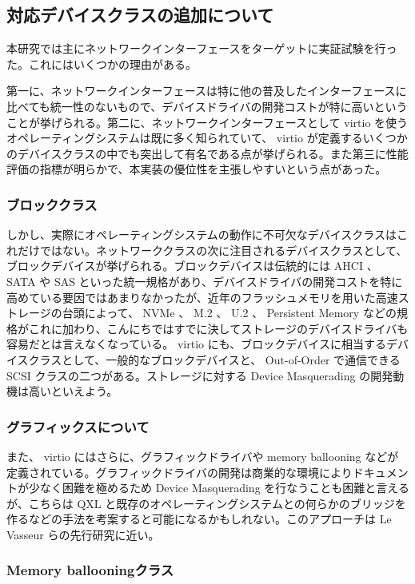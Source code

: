\documentclass[a4paper,11pt,report]{ltjsbook}
\begin{document}
\subsection{対応デバイスクラスの追加について}

本研究では主にネットワークインターフェースをターゲットに実証試験を行った。これにはいくつかの理由がある。

第一に、ネットワークインターフェースは特に他の普及したインターフェースに比べても統一性のないもので、デバイスドライバの開発コストが特に高いということが挙げられる。第二に、ネットワークインターフェースとして virtio を使うオペレーティングシステムは既に多く知られていて、 virtio が定義するいくつかのデバイスクラスの中でも突出して有名である点が挙げられる。また第三に性能評価の指標が明らかで、本実装の優位性を主張しやすいという点があった。

\subsubsection{ブロッククラス}

しかし、実際にオペレーティングシステムの動作に不可欠なデバイスクラスはこれだけではない。ネットワーククラスの次に注目されるデバイスクラスとして、ブロックデバイスが挙げられる。ブロックデバイスは伝統的には AHCI 、 SATA や SAS といった統一規格があり、デバイスドライバの開発コストを特に高めている要因ではあまりなかったが、近年のフラッシュメモリを用いた高速ストレージの台頭によって、 NVMe 、 M.2 、 U.2 、 Persistent Memory などの規格がこれに加わり、こんにちではすでに決してストレージのデバイスドライバも容易だとは言えなくなっている。 virtio にも、ブロックデバイスに相当するデバイスクラスとして、一般的なブロックデバイスと、 Out-of-Order で通信できる SCSI クラスの二つがある。ストレージに対する Device Masquerading の開発動機は高いといえよう。

\subsubsection{グラフィックスについて}

また、 virtio にはさらに、グラフィックドライバや memory ballooning などが定義されている。グラフィックドライバの開発は商業的な環境によりドキュメントが少なく困難を極めるため Device Masquerading を行なうことも困難と言えるが、こちらは QXL と既存のオペレーティングシステムとの何らかのブリッジを作るなどの手法を考案すると可能になるかもしれない。このアプローチは Le Vasseur らの先行研究\cite{reuse}に近い。

\subsubsection{Memory ballooningクラス}
\end{document}
